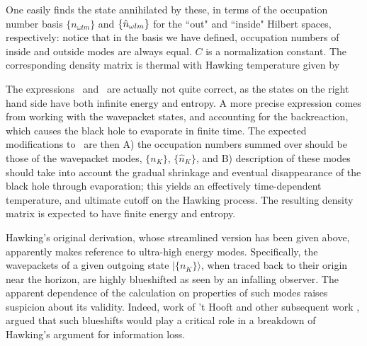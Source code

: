 One easily finds the state annihilated by these, in terms of the occupation number basis $\{n_{\omega lm}\}$ and $\{{\hat n}_{\omega lm}\}$ for
the ``out" and ``inside" Hilbert spaces, respectively:
%
\eqn{}
%
notice that in the basis we have defined, occupation numbers of inside and outside modes are always equal.  $C$ is a normalization constant.
The corresponding density matrix
%
\eqn{}
%
is thermal with Hawking temperature given by
%
\eqn{}
%

The expressions \prodH\ and \densmat\ are actually not quite correct, as the states on the right hand side have both infinite energy and entropy.   A more precise expression comes from working with the wavepacket states, and accounting for the backreaction, which causes the black hole to evaporate in finite time.  The expected modifications to \prodH\ are then A) the occupation numbers summed over should be those of the wavepacket modes, $\{n_K\}$, $\{{\hat n}_K\}$, and B)
description of these modes should take into account the gradual shrinkage and eventual disappearance of the black hole through evaporation; this yields an effectively time-dependent temperature, and ultimate cutoff on the Hawking process.  The resulting density matrix is expected to have finite energy and entropy.


Hawking's original derivation, whose streamlined version has been given above, apparently makes reference to ultra-high energy modes.  Specifically, the wavepackets of a given outgoing state $|\{n_K\}\rangle$, when traced back to their origin near the horizon, are highly blueshifted as seen by an infalling observer.  The apparent dependence of the calculation on properties of such modes raises suspicion about its validity.  Indeed, work of 't Hooft  and other subsequent work
, argued that such blueshifts would play a critical role in a breakdown of Hawking's argument for information loss.

